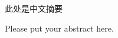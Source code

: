 
\begin{cabstract}
此处是中文摘要
\end{cabstract}


\begin{eabstract}
Please put your abstract here.
\end{eabstract}